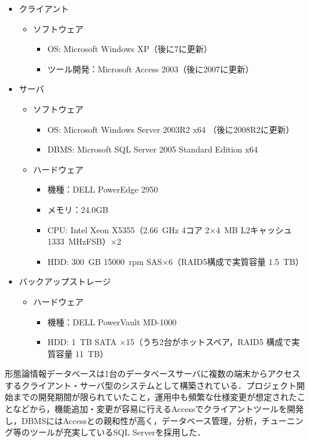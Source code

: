 \documentclass[japanese]{jnlp_1.4}
\begin{document}
\begin{itemize}
\item クライアント
	\begin{itemize}
	\item ソフトウェア
		\begin{itemize}
		\item OS: Microsoft Windows XP（後に7に更新）
		\item ツール開発：Microsoft Access 2003（後に2007に更新）
		\end{itemize}
	\end{itemize}
\item サーバ
	\begin{itemize}
		\item ソフトウェア
		\begin{itemize}
		\item OS: Microsoft Windows Server 2003R2 x64 （後に2008R2に更新）
		\item DBMS: Microsoft SQL Server 2005 Standard Edition x64
		\end{itemize}
		\item ハードウェア
	\begin{itemize}
		\item 機種：DELL PowerEdge 2950
		\item メモリ：24.0GB
		\item CPU: Intel Xeon X5355（2.66~GHz 4コア 2×4~MB L2キャッシュ \\ 1333~MHzFSB）×2
		\item HDD: 300~GB 15000~rpm SAS×6（RAID5構成で実質容量 1.5~TB）
	\end{itemize}
	\end{itemize}
\item バックアップストレージ
	\begin{itemize}
		\item ハードウェア
	\begin{itemize}
	\item 機種：DELL PowerVault MD-1000
	\item HDD: 1~TB SATA ×15（うち2台がホットスペア，RAID5 構成で実質容量 11~TB）
	\end{itemize}
	\end{itemize}
\end{itemize}

形態論情報データベースは1台のデータベースサーバに複数の端末からアクセスするクライアント・サーバ型のシステムとして構築されている．プロジェクト開始までの開発期間が限られていたこと，運用中も頻繁な仕様変更が想定されたことなどから，機能追加・変更が容易に行えるAccessでクライアントツールを開発し，DBMSにはAccessとの親和性が高く，データベース管理，分析，チューニング等のツールが充実しているSQL Serverを採用した．
\end{document}
